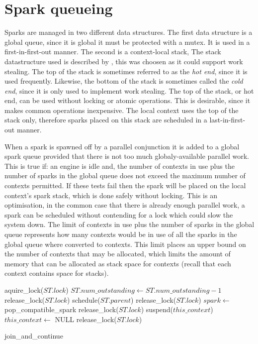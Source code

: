 \section{Spark queueing}

Sparks are managed in two different data structures.
The first data structure is a global queue,
since it is global it must be protected with a mutex.
It is used in a first-in-first-out manner.
The second is a context-local stack,
The stack datastructure used is described by \citet{workstealing_queue},
this was choosen as it could support work stealing.
The top of the stack is sometimes referred to as the \emph{hot end},
since it is used frequently.
Likewise, the bottom of the stack is sometimes called the
\emph{cold end}, since it is only used to implement work stealing.
The top of the stack, or hot end, can be used without locking or atomic
operations.
This is desirable, since it makes common operations inexpensive.
The local context uses the top of the stack only,
therefore sparks placed on this stack are scheduled in a
last-in-first-out manner.

When a spark is spawned off by a parallel conjunction
it is added to a global spark queue provided that there is not too much
globaly-available parallel work.
This is true if:
an engine is idle and,
the number of contexts in use plus the number of sparks in the global queue
does not exceed the maximum number of contexts permitted.
If these tests fail then the spark will be placed on the local context's
spark stack,
which is done safely without locking.
This is an optimisation,
in the common case that there is already enough parallel work,
a spark can be scheduled without contending for a lock which could slow the
system down.
The limit of contexts in use plus the number of sparks in the global queue
represents how many contexts would be in use of all the sparks in the global
queue where converted to contexts.
This limit places an upper bound on the number of contexts that may be
allocated,
which limits the amount of memory that can be allocated as stack space for
contexts
(recall that each context contains space for stacks).

\begin{algorithm}
\begin{algorithmic}
  \State aquire\_lock($ST.lock$)
  \State $ST.num\_outstanding \gets ST.num\_outstanding - 1$
      \State release\_lock($ST.lock$)
    \Else
      \State schedule($ST.parent$)
      \State release\_lock($ST.lock$)
    \EndIf
  \Else
    \State $spark \gets$ pop\_compatible\_spark
       \State release\_lock($ST.lock$)
    \Else
         \State suspend($this\_context$)
         \State $this\_context \gets$ NULL
      \EndIf
      \State release\_lock($ST.lock$)
    \EndIf
  \EndIf
\EndProcedure
\end{algorithmic}
\caption{join\_and\_continue}
\label{alg:join_and_continue_peterw}
\end{algorithm}

